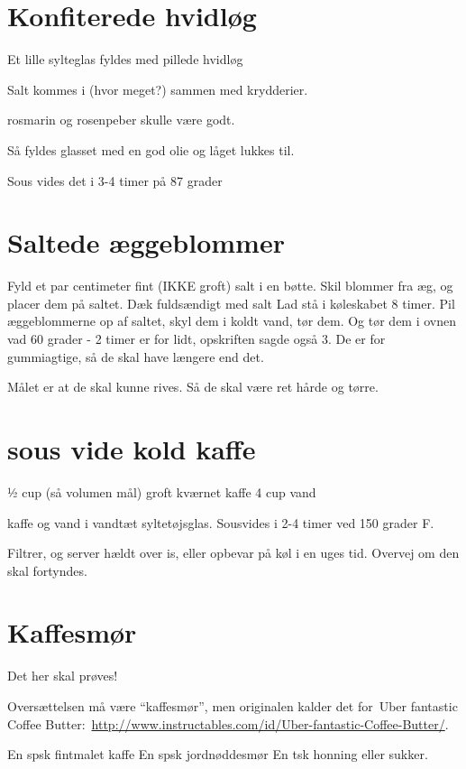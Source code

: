 \documentclass[
]{book}
\begin{document}
\section{Konfiterede hvidløg}\label{konfiterede-hvidluxf8g}

Et lille sylteglas fyldes med pillede hvidløg

Salt kommes i (hvor meget?) sammen med krydderier.

rosmarin og rosenpeber skulle være godt.

Så fyldes glasset med en god olie og låget lukkes til.

Sous vides det i 3-4 timer på 87 grader

\section{Saltede æggeblommer}\label{saltede-uxe6ggeblommer}

Fyld et par centimeter fint (IKKE groft) salt i en bøtte.
Skil blommer fra æg, og placer dem på saltet. Dæk fuldsændigt med salt
Lad stå i køleskabet 8 timer.
Pil æggeblommerne op af saltet, skyl dem i koldt vand, tør dem. Og
tør dem i ovnen vad 60 grader - 2 timer er for lidt, opskriften sagde også 3.
De er for gummiagtige, så de skal have længere end det.

Målet er at de skal kunne rives. Så de skal være ret hårde og tørre.

\section{sous vide kold kaffe}\label{sous-vide-kold-kaffe}

½ cup (så volumen mål) groft kværnet kaffe
4 cup vand

kaffe og vand i vandtæt syltetøjsglas. Sousvides i 2-4 timer ved 150 grader F.

Filtrer, og server hældt over is, eller opbevar på køl i en uges tid.
Overvej om den skal fortyndes.

\section{Kaffesmør}\label{kaffesmuxf8r}

Det her skal prøves!~

Oversættelsen må være ``kaffesmør'', men originalen kalder det for~Uber fantastic Coffee Butter:~\url{http://www.instructables.com/id/Uber-fantastic-Coffee-Butter/}.

En spsk fintmalet kaffe
En spsk jordnøddesmør
En tsk honning eller sukker.
\end{document}
